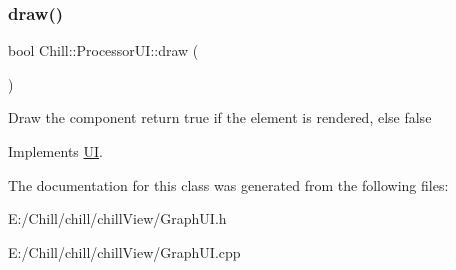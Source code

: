 \subsubsection{\texorpdfstring{draw()}{draw()}}
{\footnotesize\ttfamily bool Chill\+::\+Processor\+U\+I\+::draw (\begin{DoxyParamCaption}{ }\end{DoxyParamCaption})\hspace{0.3cm}{\ttfamily [virtual]}}

Draw the component return true if the element is rendered, else false 

Implements \mbox{\hyperlink{class_u_i_a5025b88e26f21852c0cd2e4b42675c50}{UI}}.



The documentation for this class was generated from the following files\+:\begin{DoxyCompactItemize}
\item 
E\+:/\+Chill/chill/chill\+View/Graph\+U\+I.\+h\item 
E\+:/\+Chill/chill/chill\+View/Graph\+U\+I.\+cpp\end{DoxyCompactItemize}
